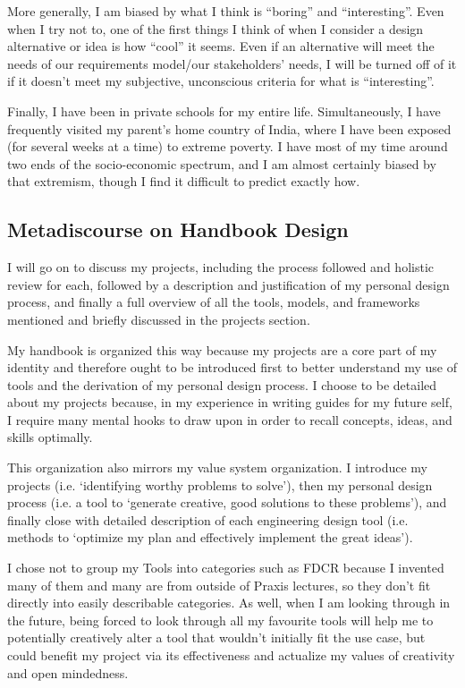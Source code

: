 \documentclass[a4paper,12pt]{article}
\begin{document}
More generally, I am biased by what I think is “boring” and “interesting”. Even when I try not to, one of the first things I think of when I consider a design alternative or idea is how “cool” it seems. Even if an alternative will meet the needs of our requirements model/our stakeholders’ needs, I will be turned off of it if it doesn’t meet my subjective, unconscious criteria for what is “interesting”.

Finally, I have been in private schools for my entire life. Simultaneously, I have frequently visited my parent’s home country of India, where I have been exposed (for several weeks at a time) to extreme poverty. I have most of my time around two ends of the socio-economic spectrum, and I am almost certainly biased by that extremism, though I find it difficult to predict exactly how.

\subsection{Metadiscourse on Handbook Design}
I will go on to discuss my projects, including the process followed and holistic review for each, followed by a description and justification of my personal design process, and finally a full overview of all the tools, models, and frameworks mentioned and briefly discussed in the projects section.

My handbook is organized this way because my projects are a core part of my identity and therefore ought to be introduced first to better understand my use of tools and the derivation of my personal design process. I choose to be detailed about my projects because, in my experience in writing guides for my future self, I require many mental hooks to draw upon in order to recall concepts, ideas, and skills optimally.

This organization also mirrors my value system organization. I introduce my projects (i.e. ‘identifying worthy problems to solve’), then my personal design process (i.e. a tool to ‘generate creative, good solutions to these problems’), and finally close with detailed description of each engineering design tool (i.e. methods to ‘optimize my plan and effectively implement the great ideas’).

I chose not to group my Tools into categories such as FDCR because I invented many of them and many are from outside of Praxis lectures, so they don’t fit directly into easily describable categories. As well, when I am looking through in the future, being forced to look through all my favourite tools will help me to potentially creatively alter a tool that wouldn’t initially fit the use case, but could benefit my project via its effectiveness and actualize my values of creativity and open mindedness.
\end{document}

